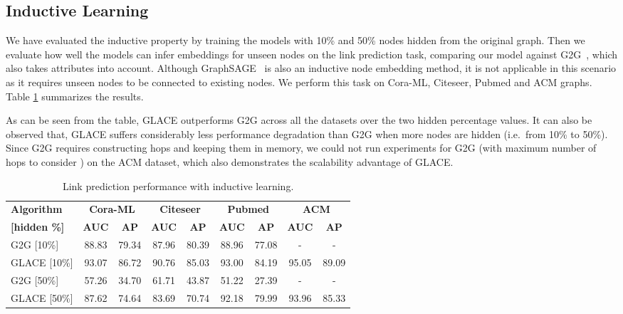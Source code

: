 \documentclass[runningheads]{llncs}
\begin{document}
\subsection{Inductive Learning}

We have evaluated the inductive property by training the models with 10\% and 50\% nodes hidden from the original graph. Then we evaluate how well the models can infer embeddings for unseen nodes on the link prediction task, comparing our model against G2G~\cite{g2g}, which also takes attributes into account. Although GraphSAGE~\cite{DBLP:graphsage} is also an inductive node embedding method, it is not applicable in this scenario as it requires unseen nodes to be connected to existing nodes. 
We perform this task on Cora-ML, Citeseer, Pubmed and ACM graphs. 
Table \ref{tab:link_prediction_ind} summarizes the results. 

As can be seen from the table, GLACE outperforms G2G across all the datasets over the two hidden percentage values. It can also be observed that, GLACE suffers considerably less performance degradation than G2G when more nodes are hidden (i.e.\ from 10\% to 50\%). Since G2G requires constructing hops and keeping them in memory, we could not run experiments for G2G (with maximum number of hops to consider ) on the ACM dataset, which also demonstrates the scalability advantage of GLACE.

\begin{table}[t]
\caption{\small Link prediction performance with inductive learning.}
\label{tab:link_prediction_ind}
\vspace{-2mm}
\begin{center}
    \begin{tabular}{|l|cc|cc|cc|cc|}
        \hline
        \textbf{Algorithm} &\multicolumn{2}{c|}{\textbf{Cora-ML}} &  \multicolumn{2}{c|}{\textbf{Citeseer}} & \multicolumn{2}{c|}{\textbf{Pubmed}} & \multicolumn{2}{c|}{\textbf{ACM}} \\
        \textbf{[hidden \%]} & \textbf{AUC} & \textbf{AP} & \textbf{AUC} & \textbf{AP} & \textbf{AUC} & \textbf{AP} & \textbf{AUC} & \textbf{AP} \\
        \hline
        G2G [10\%] & 88.83 & 79.34 & 87.96 & 80.39 & 88.96 & 77.08 & - & - \\
        GLACE [10\%]  & 93.07 & 86.72 & 90.76 & 85.03 & 93.00 & 84.19 & 95.05 & 89.09 \\
        \hline
        G2G [50\%] & 57.26 & 34.70 & 61.71 & 43.87 & 51.22 & 27.39 & - & - \\
        GLACE [50\%]  & 87.62 & 74.64 & 83.69 & 70.74 & 92.18 & 79.99 & 93.96 & 85.33 \\
        \hline
    \end{tabular}
\end{center}
\vspace{-8mm}
\end{table}
\end{document}

